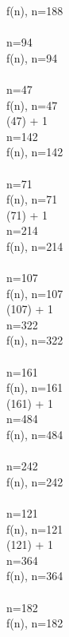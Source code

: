 \documentclass{article}
\begin{document}
f(n), n=188
 \\ 
 \Rightarrow {} 
 \\ 
 \Rightarrow n=94
 \\[3mm] 
f(n), n=94
 \\ 
 \Rightarrow {} 
 \\ 
 \Rightarrow n=47
 \\[3mm] 
f(n), n=47
 \\ 
 (47) + 1
 \\ 
 \Rightarrow n=142
 \\[3mm] 
f(n), n=142
 \\ 
 \Rightarrow {} 
 \\ 
 \Rightarrow n=71
 \\[3mm] 
f(n), n=71
 \\ 
 (71) + 1
 \\ 
 \Rightarrow n=214
 \\[3mm] 
f(n), n=214
 \\ 
 \Rightarrow {} 
 \\ 
 \Rightarrow n=107
 \\[3mm] 
f(n), n=107
 \\ 
 (107) + 1
 \\ 
 \Rightarrow n=322
 \\[3mm] 
f(n), n=322
 \\ 
 \Rightarrow {} 
 \\ 
 \Rightarrow n=161
 \\[3mm] 
f(n), n=161
 \\ 
 (161) + 1
 \\ 
 \Rightarrow n=484
 \\[3mm] 
f(n), n=484
 \\ 
 \Rightarrow {} 
 \\ 
 \Rightarrow n=242
 \\[3mm] 
f(n), n=242
 \\ 
 \Rightarrow {} 
 \\ 
 \Rightarrow n=121
 \\[3mm] 
f(n), n=121
 \\ 
 (121) + 1
 \\ 
 \Rightarrow n=364
 \\[3mm] 
f(n), n=364
 \\ 
 \Rightarrow {} 
 \\ 
 \Rightarrow n=182
 \\[3mm] 
f(n), n=182
 \\ 
\end{document}
